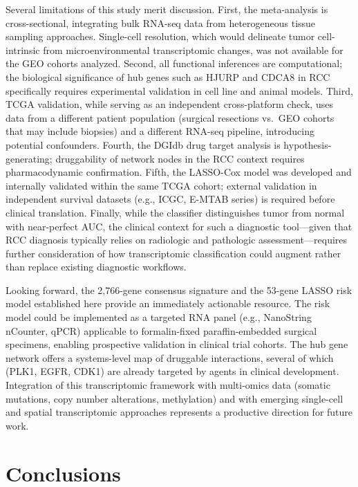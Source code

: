 \documentclass[
  12pt,
]{article}
\begin{document}
Several limitations of this study merit discussion. First, the
meta-analysis is cross-sectional, integrating bulk RNA-seq data from
heterogeneous tissue sampling approaches. Single-cell resolution, which
would delineate tumor cell-intrinsic from microenvironmental
transcriptomic changes, was not available for the GEO cohorts analyzed.
Second, all functional inferences are computational; the biological
significance of hub genes such as HJURP and CDCA8 in RCC specifically
requires experimental validation in cell line and animal models. Third,
TCGA validation, while serving as an independent cross-platform check,
uses data from a different patient population (surgical resections
vs.~GEO cohorts that may include biopsies) and a different RNA-seq
pipeline, introducing potential confounders. Fourth, the DGIdb drug
target analysis is hypothesis-generating; druggability of network nodes
in the RCC context requires pharmacodynamic confirmation. Fifth, the
LASSO-Cox model was developed and internally validated within the same
TCGA cohort; external validation in independent survival datasets (e.g.,
ICGC, E-MTAB series) is required before clinical translation. Finally,
while the classifier distinguishes tumor from normal with near-perfect
AUC, the clinical context for such a diagnostic tool---given that RCC
diagnosis typically relies on radiologic and pathologic
assessment---requires further consideration of how transcriptomic
classification could augment rather than replace existing diagnostic
workflows.

Looking forward, the 2,766-gene consensus signature and the 53-gene
LASSO risk model established here provide an immediately actionable
resource. The risk model could be implemented as a targeted RNA panel
(e.g., NanoString nCounter, qPCR) applicable to formalin-fixed
paraffin-embedded surgical specimens, enabling prospective validation in
clinical trial cohorts. The hub gene network offers a systems-level map
of druggable interactions, several of which (PLK1, EGFR, CDK1) are
already targeted by agents in clinical development. Integration of this
transcriptomic framework with multi-omics data (somatic mutations, copy
number alterations, methylation) and with emerging single-cell and
spatial transcriptomic approaches represents a productive direction for
future work.

\section{Conclusions}\label{conclusions}
\end{document}
